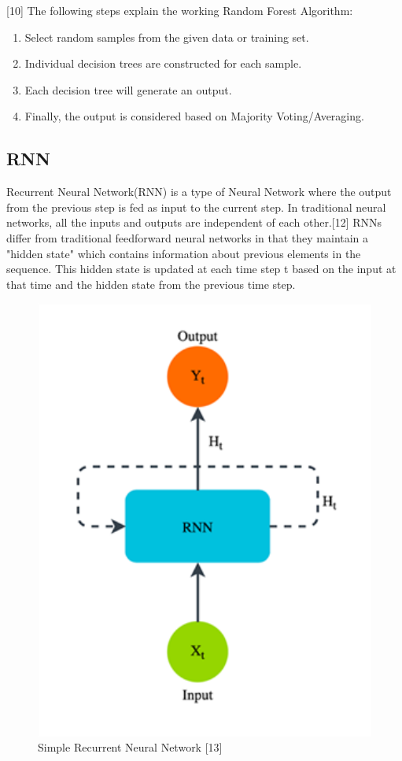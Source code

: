 \documentclass{ieeeojies}
\begin{document}
[10] The following steps explain the working Random Forest Algorithm:
\begin{enumerate}
  \item Select random samples from the given data or training set.
  \item Individual decision trees are constructed for each sample.
  \item Each decision tree will generate an output.
  \item Finally, the output is considered based on Majority Voting/Averaging.
\end{enumerate}

\subsection{RNN}
Recurrent Neural Network(RNN) is a type of Neural Network where the output from the previous step is fed as input to the current step. In traditional neural networks, all the inputs and outputs are independent of each other.[12] RNNs differ from traditional feedforward neural networks in that they maintain a "hidden state" which contains information about previous elements in the sequence. This hidden state is updated at each time step t based on the input at that time and the hidden state from the previous time step.
\begin{figure}[H]
    \centering
    \begin{minipage}{0.23\textwidth}
    \centering
    \includegraphics[width=1\textwidth]{Simple RNN.png}
    \caption{Simple Recurrent Neural Network [13]}
    \label{fig:1}
    \end{minipage}
\end{figure}
\end{document}
